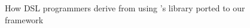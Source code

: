 \documentclass[sigplan,review,fleqn]{acmart}
\renewcommand{\verb}{\collectverb{\color{AgdaFunction}}}
\begin{document}


\begin{figure}
	\centering
	\caption{How DSL programmers derive  from  using \citeauthor{Allais-generic-syntax}'s library ported to our framework}
	\label{fig:flow}
\end{figure}

\end{document}
